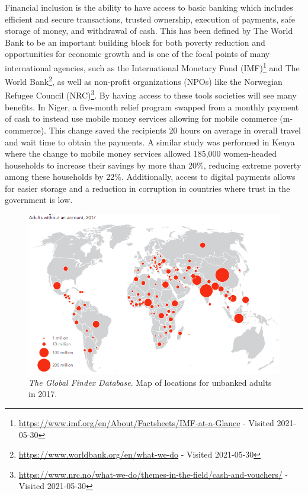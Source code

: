 \documentclass[11pt, a4paper]{article}
\begin{document}
Financial inclusion is the ability to have access to basic banking which includes efficient and secure transactions, trusted ownership, execution of payments, safe storage of money, and withdrawal of cash. This has been defined by The World Bank to be an important building block for both poverty reduction and opportunities for economic growth\cite{gfindex} and is one of the focal points of many international agencies, such as the International Monetary Fund (IMF)\footnote{\url{https://www.imf.org/en/About/Factsheets/IMF-at-a-Glance} - Visited 2021-05-30} and The World Bank\footnote{\url{https://www.worldbank.org/en/what-we-do} - Visited 2021-05-30}, as well as non-profit organizations (NPOs) like the Norwegian Refugee Council (NRC)\footnote{\url{https://www.nrc.no/what-we-do/themes-in-the-field/cash-and-vouchers/} - Visited 2021-05-30}. By having access to these tools societies will see many benefits. In Niger, a five-month relief program swapped from a monthly payment of cash to instead use mobile money services allowing for mobile commerce (m-commerce). This change saved the recipients 20 hours on average in overall travel and wait time to obtain the payments\cite{gfindex}. A similar study was performed in Kenya where the change to mobile money services allowed 185,000 women-headed households to increase their savings by more than 20\%, reducing extreme poverty among these households by 22\%\cite{gfindex}. Additionally, access to digital payments allows for easier storage and a reduction in corruption in countries where trust in the government is low\cite{gfindex}.

\begin{figure}[ht]
\centering
\includegraphics[width=1\linewidth]{figs/unbanked_map}
\caption{\textit{The Global Findex Database}\cite{gfindex}. Map of locations for unbanked adults in 2017.}
\label{fig: unbanked_map}
\end{figure}
\end{document}
